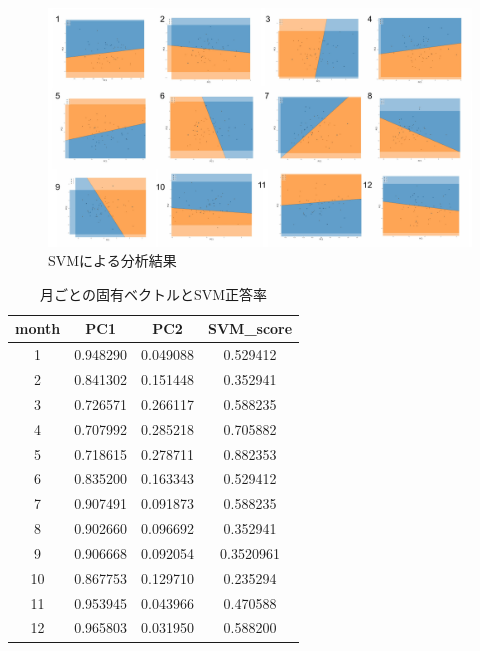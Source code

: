 \documentclass{jarticle}
\begin{document}
\begin{figure}[H]
\centering
\includegraphics[keepaspectratio, scale=0.56]
{svm_plot.pdf}
\caption{SVMによる分析結果}
\label{svm}
\end{figure}

\begin{table}[H]
\caption{月ごとの固有ベクトルとSVM正答率}
\begin{tabular}{|c|c|c|c|} \hline
month&PC1&PC2 &SVM\_score\\ \hline
 1&0.948290&0.049088&0.529412\\ \hline
 2&0.841302&0.151448&0.352941\\ \hline
 3&0.726571&0.266117&0.588235\\ \hline
 4&0.707992 &0.285218&0.705882\\ \hline
 5&0.718615&0.278711&0.882353\\ \hline
 6&0.835200&0.163343&0.529412\\ \hline
 7&0.907491&0.091873&0.588235\\ \hline
 8&0.902660&0.096692&0.352941\\ \hline
 9&0.906668&0.092054&0.3520961\\ \hline
 10&0.867753&0.129710&0.235294\\ \hline
 11&0.953945&0.043966&0.470588\\ \hline
 12&0.965803&0.031950&0.588200\\ \hline
\end{tabular}
\centering
\label{score}
\end{table}
\end{document}
